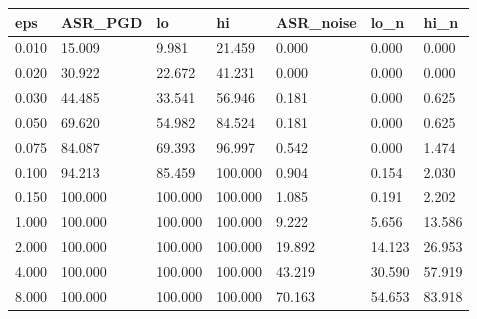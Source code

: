 \begin{tabular}{lllllll}
\hline
eps & ASR\_PGD & lo & hi & ASR\_noise & lo\_n & hi\_n \\
\hline
0.010 & 15.009 & 9.981 & 21.459 & 0.000 & 0.000 & 0.000 \\
0.020 & 30.922 & 22.672 & 41.231 & 0.000 & 0.000 & 0.000 \\
0.030 & 44.485 & 33.541 & 56.946 & 0.181 & 0.000 & 0.625 \\
0.050 & 69.620 & 54.982 & 84.524 & 0.181 & 0.000 & 0.625 \\
0.075 & 84.087 & 69.393 & 96.997 & 0.542 & 0.000 & 1.474 \\
0.100 & 94.213 & 85.459 & 100.000 & 0.904 & 0.154 & 2.030 \\
0.150 & 100.000 & 100.000 & 100.000 & 1.085 & 0.191 & 2.202 \\
1.000 & 100.000 & 100.000 & 100.000 & 9.222 & 5.656 & 13.586 \\
2.000 & 100.000 & 100.000 & 100.000 & 19.892 & 14.123 & 26.953 \\
4.000 & 100.000 & 100.000 & 100.000 & 43.219 & 30.590 & 57.919 \\
8.000 & 100.000 & 100.000 & 100.000 & 70.163 & 54.653 & 83.918 \\
\hline
\end{tabular}
